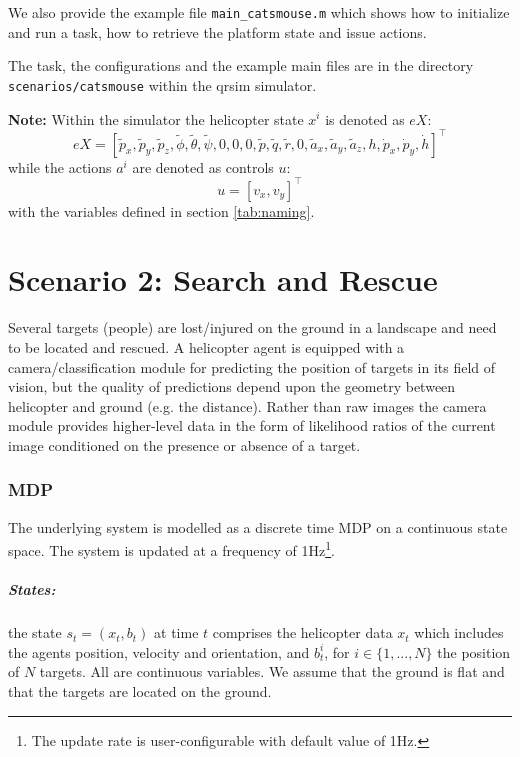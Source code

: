 \documentclass[a4paper,11pt]{report}
\newcommand\mytexttt[1]{\texttt{\hyphenchar\font=45\relax #1}}
\begin{document}
We also provide the example file \texttt{main\_catsmouse.m} which shows how to initialize and run a task, how to retrieve the platform state
and issue actions.

The task, the configurations and the example main files are in the directory \mytexttt{scenarios/catsmouse} within the qrsim simulator. 

\textbf{Note:}
Within the simulator the helicopter state $x^i$ is denoted as $eX$:
$$eX = [\tilde{p}_x,\tilde{p}_y,\tilde{p}_z,\tilde{\phi},\tilde{\theta},\tilde{\psi},0,0,0,\tilde{p},\tilde{q},\tilde{r},0,\tilde{a}_x,\tilde{a}_y,\tilde{a}_z,h,\dot{p}_x,\dot{p}_y,\dot{h}]^\intercal$$
while the actions $a^i$ are denoted as controls $u$:
$$u=[v_x,v_y]^\intercal$$
with the variables defined in section \ref{tab:naming}.


\newpage
\chapter{Scenario 2: Search and Rescue}
Several targets (people) are lost/injured on the ground in a landscape and need to be located and rescued. A helicopter agent is equipped with a camera/classification module for predicting the position of targets in its field of vision, but the quality of predictions depend upon the geometry between helicopter and ground (e.g. the distance). Rather than raw images the camera module provides higher-level data in the form of likelihood ratios of the current image conditioned on the presence or absence of a target.

\subsection{MDP}

The underlying system is modelled as a discrete time MDP on a continuous state space. The system is updated at a frequency of 1Hz\footnote{The update rate is user-configurable with default value of 1Hz.}. 

\paragraph{States:} the state $s_t=(x_t,b_t)$ at time $t$ comprises the helicopter data $x_t$ which includes the agents position, velocity and orientation, and $b^i_{t}$, for $i\in\{1,...,N\}$ the position of $N$ targets. All are continuous variables. We assume that the ground is flat and that the targets are located on the ground.
\end{document}
